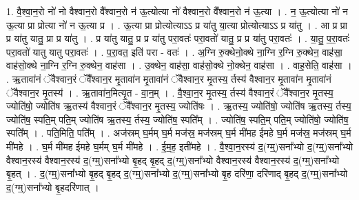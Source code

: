 \documentclass[17pt]{extarticle}
\begin{document}
1. वै॒श्वा॒न॒रो नो॑ नो वैश्वान॒रो वै᳚श्वान॒रो न॑ ऊ॒त्योत्या नो॑ वैश्वान॒रो वै᳚श्वान॒रो न॑ ऊ॒त्या । . न॒ ऊ॒त्योत्या नो॑ न ऊ॒त्या प्रा प्रोत्या नो॑ न ऊ॒त्या प्र । . ऊ॒त्या प्रा प्रोत्योत्याऽऽ प्र या॑तु या॒त्या प्रोत्योत्याऽऽ प्र या॑तु । . आ प्र प्रा प्र या॑तु यातु॒ प्रा प्र या॑तु । . प्र या॑तु यातु॒ प्र प्र या॑तु परा॒वतः॑ परा॒वतो॑ यातु॒ प्र प्र या॑तु परा॒वतः॑ । . या॒तु॒ प॒रा॒वतः॑ परा॒वतो॑ यातु यातु परा॒वतः॑ । . प॒रा॒वत॒ इति॑ परा - वतः॑ । . अ॒ग्नि रु॒क्थेनो॒क्थे ना॒ग्नि र॒ग्नि रु॒क्थेन॒ वाह॑सा॒ वाह॑सो॒क्थे ना॒ग्नि र॒ग्नि रु॒क्थेन॒ वाह॑सा । . उ॒क्थेन॒ वाह॑सा॒ वाह॑सो॒क्थे नो॒क्थेन॒ वाह॑सा । . वाह॒सेति॒ वाह॑सा । . ऋ॒तावा॑नं ॅवैश्वान॒रं ॅवै᳚श्वान॒र मृ॒तावा॑न मृ॒तावा॑नं ॅवैश्वान॒र मृ॒तस्य॒ र्तस्य॑ वैश्वान॒र मृ॒तावा॑न मृ॒तावा॑नं ॅवैश्वान॒र मृ॒तस्य॑ । . ऋ॒तावा॑न॒मित्यृ॒त - वा॒न॒म् । . वै॒श्वा॒न॒र मृ॒तस्य॒ र्तस्य॑ वैश्वान॒रं ॅवै᳚श्वान॒र मृ॒तस्य॒ ज्योति॑षो॒ ज्योति॑ष ऋ॒तस्य॑ वैश्वान॒रं ॅवै᳚श्वान॒र मृ॒तस्य॒ ज्योति॑षः । . ऋ॒तस्य॒ ज्योति॑षो॒ ज्योति॑ष ऋ॒तस्य॒ र्तस्य॒ ज्योति॑ष॒ स्पति॒म् पति॒म् ज्योति॑ष ऋ॒तस्य॒ र्तस्य॒ ज्योति॑ष॒ स्पति᳚म् । . ज्योति॑ष॒ स्पति॒म् पति॒म् ज्योति॑षो॒ ज्योति॑ष॒ स्पति᳚म् । . पति॒मिति॒ पति᳚म् । . अज॑स्रम् घ॒र्मम् घ॒र्म मज॑स्र॒ मज॑स्रम् घ॒र्म मी॑मह ईमहे घ॒र्म मज॑स्र॒ मज॑स्रम् घ॒र्म मी॑महे । . घ॒र्म मी॑मह ईमहे घ॒र्मम् घ॒र्म मी॑महे । . ई॒म॒ह॒ इती॑महे । . वै॒श्वा॒न॒रस्य॑ द॒(ग्म्॒)सना᳚भ्यो द॒(ग्म्॒)सना᳚भ्यो वैश्वान॒रस्य॑ वैश्वान॒रस्य॑ द॒(ग्म्॒)सना᳚भ्यो बृ॒हद् बृ॒हद् द॒(ग्म्॒)सना᳚भ्यो वैश्वान॒रस्य॑ वैश्वान॒रस्य॑ द॒(ग्म्॒)सना᳚भ्यो बृ॒हत् । . द॒(ग्म्॒)सना᳚भ्यो बृ॒हद् बृ॒हद् द॒(ग्म्॒)सना᳚भ्यो द॒(ग्म्॒)सना᳚भ्यो बृ॒ह दरि॑णा॒ दरि॑णाद् बृ॒हद् द॒(ग्म्॒)सना᳚भ्यो द॒(ग्म्॒)सना᳚भ्यो बृ॒हदरि॑णात् । \newline
\end{document}
